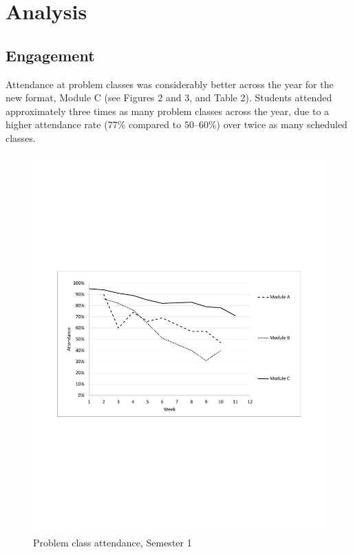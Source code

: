 \documentclass{amsart}
\begin{document}
\section{Analysis}

\subsection*{Engagement}

Attendance at problem classes was considerably better across the year for the new format, Module C (see Figures 2 and 3, and Table 2).  Students attended approximately three times as many problem classes across the year, due to a higher attendance rate ($77\%$ compared to $50$--$60\%$) over twice as many scheduled classes.

\begin{center}
\begin{figure}[hbt]
\includegraphics[bb=50 250 562 545,width=1\textwidth]{figure2.pdf}
\caption{Problem class attendance, Semester 1}
\end{figure}
\end{center}
\end{document}
